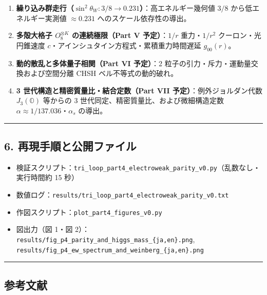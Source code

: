 \documentclass[
  a4paper,
]{ltjsarticle}
\providecommand{\tightlist}{%
  \setlength{\itemsep}{0pt}\setlength{\parskip}{0pt}}
\begin{document}
\begin{enumerate}
\def\labelenumi{\arabic{enumi}.}
\tightlist
\item
  \textbf{繰り込み群走行（\(\sin^2\theta_W: 3/8 \to 0.231\)）}：高エネルギー幾何値
  \(3/8\) から低エネルギー実測値 \(\approx 0.231\)
  へのスケール依存性の導出。
\item
  \textbf{多殻大格子 \(O_8^{\otimes K}\) の連続極限（Part V
  予定）}：\(1/r\) 重力・\(1/r^2\) クーロン・光円錐速度
  \(c\)・アインシュタイン方程式・累積重力時間遅延 \(g_{00}(r)\)。
\item
  \textbf{動的散乱と多体量子相関（Part VI 予定）}：2
  粒子の引力・斥力・運動量交換および空間分離 CHSH ベル不等式の動的破れ。
\item
  \textbf{3 世代構造と精密質量比・結合定数（Part VII
  予定）}：例外ジョルダン代数 \(J_3(\mathbb{O})\) 等からの 3
  世代同定、精密質量比、および微細構造定数
  \(\alpha \approx 1/137.036\)・\(\alpha_s\) の導出。
\end{enumerate}

\begin{center}\rule{0.5\linewidth}{0.5pt}\end{center}

\subsection{6.
再現手順と公開ファイル}\label{ux518dux73feux624bux9806ux3068ux516cux958bux30d5ux30a1ux30a4ux30eb}

\begin{itemize}
\tightlist
\item
  検証スクリプト：\texttt{tri\_loop\_part4\_electroweak\_parity\_v0.py}（乱数なし・実行時間約
  15 秒）
\item
  数値ログ：\texttt{results/tri\_loop\_part4\_electroweak\_parity\_v0.txt}
\item
  作図スクリプト：\texttt{plot\_part4\_figures\_v0.py}
\item
  図出力（図 1・図
  2）：\texttt{results/fig\_p4\_parity\_and\_higgs\_mass\_\{ja,en\}.png},
  \texttt{results/fig\_p4\_ew\_spectrum\_and\_weinberg\_\{ja,en\}.png}
\end{itemize}

\begin{center}\rule{0.5\linewidth}{0.5pt}\end{center}

\subsection{参考文献}\label{ux53c2ux8003ux6587ux732e}
\end{document}
